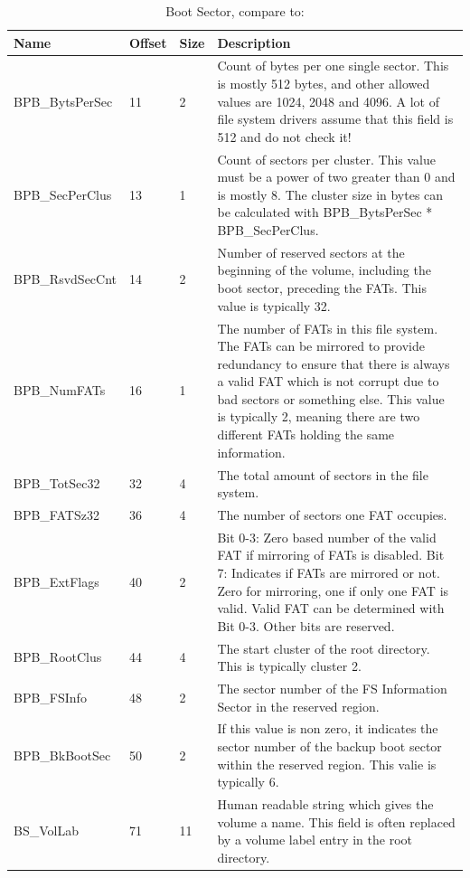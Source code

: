 \begin{table}[!ht]
\caption{Boot Sector, compare to: \cite{usb_ms_jan, fatgen103}}
\centering
\begin{tabular}{|l|l|l|p{9cm}|}
\hline\hline
\textbf{Name} & \textbf{Offset} & \textbf{Size} & \textbf{Description}\\ \hline
BPB\_BytsPerSec & 11 & 2 & Count of bytes per one single sector. This is mostly 512 bytes, and other allowed values are 1024, 2048 and 4096. A lot of file system drivers assume that this field is 512 and do not check it! \\ \hline
BPB\_SecPerClus & 13 & 1 & Count of sectors per cluster. This value must be a power of two greater than 0 and is mostly 8. The cluster size in bytes can be calculated with BPB\_BytsPerSec * BPB\_SecPerClus. \\ \hline
BPB\_RsvdSecCnt & 14 & 2 & Number of reserved sectors at the beginning of the volume, including the boot sector, preceding the FATs. This value is typically 32. \\ \hline
BPB\_NumFATs & 16 & 1 & The number of FATs in this file system. The FATs can be mirrored to provide redundancy to ensure that there is always a valid FAT which is not corrupt due to bad sectors or something else. This value is typically 2, meaning there are two different FATs holding the same information. \\ \hline
BPB\_TotSec32 & 32 & 4 & The total amount of sectors in the file system. \\ \hline
BPB\_FATSz32 & 36 & 4 & The number of sectors one FAT occupies. \\ \hline
BPB\_ExtFlags & 40 & 2 & Bit 0-3: Zero based number of the valid FAT if mirroring of FATs is disabled. Bit 7: Indicates if FATs are mirrored or not. Zero for mirroring, one if only one FAT is valid. Valid FAT can be determined with Bit 0-3. Other bits are reserved. \\ \hline
BPB\_RootClus & 44 & 4 & The start cluster of the root directory. This is typically cluster 2. \\ \hline
BPB\_FSInfo & 48 & 2 & The sector number of the FS Information Sector in the reserved region. \\ \hline
BPB\_BkBootSec & 50 & 2 & If this value is non zero, it indicates the sector number of the backup boot sector within the reserved region. This valie is typically 6. \\ \hline
BS\_VolLab & 71 & 11 & Human readable string which gives the volume a name. This field is often replaced by a volume label entry in the root directory. \\ \hline
\end{tabular}
\label{table:fat_boot_sector}
\end{table}

